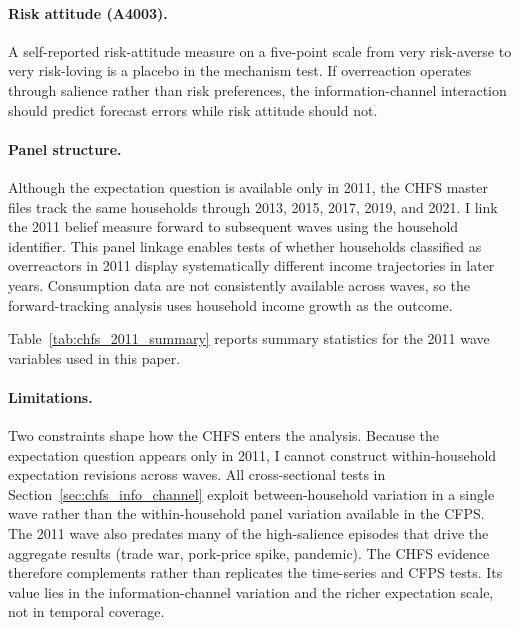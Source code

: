 \paragraph{Risk attitude (A4003).}
A self-reported risk-attitude measure on a five-point scale from very
risk-averse to very risk-loving is a placebo in the mechanism
test. If overreaction operates through salience rather than risk
preferences, the information-channel interaction should predict
forecast errors while risk attitude should not.

\paragraph{Panel structure.}
Although the expectation question is available only in 2011, the CHFS
master files track the same households through 2013, 2015, 2017, 2019,
and 2021. I link the 2011 belief measure forward to subsequent waves
using the household identifier. This panel linkage enables tests of
whether households classified as overreactors in 2011 display
systematically different income trajectories in later years.
Consumption data are not consistently available across waves, so the
forward-tracking analysis uses household income growth as the outcome.

Table~\ref{tab:chfs_2011_summary} reports summary statistics for the
2011 wave variables used in this paper.



\paragraph{Limitations.}
Two constraints shape how the CHFS enters the analysis. Because
the expectation question appears only in 2011, I cannot construct
within-household expectation revisions across waves. All
cross-sectional tests in Section~\ref{sec:chfs_info_channel} exploit
between-household variation in a single wave rather than the
within-household panel variation available in the CFPS. The
2011 wave also predates many of the high-salience episodes that drive
the aggregate results (trade war, pork-price spike, pandemic). The CHFS
evidence therefore complements rather than replicates the time-series
and CFPS tests. Its value lies in the information-channel variation and
the richer expectation scale, not in temporal coverage.


